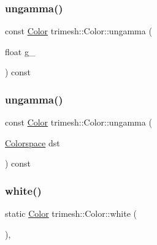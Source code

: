 \mbox{\label{classtrimesh_1_1Color_a26bd1dd5b2521e58e0a80d98b76a8fbe}} 
\subsubsection{\texorpdfstring{ungamma()}{ungamma()}\hspace{0.1cm}{\footnotesize\ttfamily [1/2]}}
{\footnotesize\ttfamily const \hyperlink{classtrimesh_1_1Color}{Color} trimesh\+::\+Color\+::ungamma (\begin{DoxyParamCaption}\item[{float}]{g\+\_\+ }\end{DoxyParamCaption}) const\hspace{0.3cm}{\ttfamily [inline]}}

\mbox{\label{classtrimesh_1_1Color_a053596dda07bead7e3f63b3ee5cb4625}} 
\subsubsection{\texorpdfstring{ungamma()}{ungamma()}\hspace{0.1cm}{\footnotesize\ttfamily [2/2]}}
{\footnotesize\ttfamily const \hyperlink{classtrimesh_1_1Color}{Color} trimesh\+::\+Color\+::ungamma (\begin{DoxyParamCaption}\item[{\hyperlink{classtrimesh_1_1Color_a2e472a2f6056fb5d0d835ee1c361b6da}{Colorspace}}]{dst }\end{DoxyParamCaption}) const\hspace{0.3cm}{\ttfamily [inline]}}

\mbox{\label{classtrimesh_1_1Color_ae400e9cbab4e192250e9dbb4cb2cf2dc}} 
\subsubsection{\texorpdfstring{white()}{white()}}
{\footnotesize\ttfamily static \hyperlink{classtrimesh_1_1Color}{Color} trimesh\+::\+Color\+::white (\begin{DoxyParamCaption}{ }\end{DoxyParamCaption})\hspace{0.3cm}{\ttfamily [inline]}, {\ttfamily [static]}}

